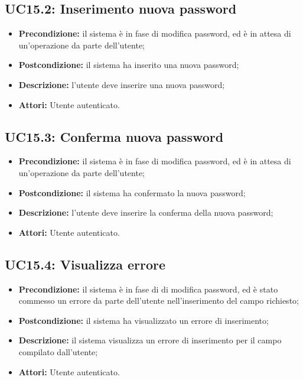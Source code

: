 \subsection{ UC15.2: Inserimento nuova password}

\begin{itemize}
	\item \textbf{Precondizione:} il sistema è in fase di modifica password, ed è in attesa di un'operazione da parte dell'utente;
	\item \textbf{Postcondizione:} il sistema ha inserito una nuova password;
	\item \textbf{Descrizione:} l'utente deve inserire una nuova password;
	\item \textbf{Attori:} Utente autenticato.
\end{itemize}
\subsection{ UC15.3: Conferma nuova password}

\begin{itemize}
	\item \textbf{Precondizione:} il sistema è in fase di modifica password, ed è in attesa di un'operazione da parte dell'utente;
	\item \textbf{Postcondizione:} il sistema ha confermato la nuova password;
	\item \textbf{Descrizione:} l'utente deve inserire la conferma della nuova password;
	\item \textbf{Attori:} Utente autenticato.
\end{itemize}
\subsection{ UC15.4: Visualizza errore}

\begin{itemize}
	\item \textbf{Precondizione:} il sistema è in fase di di modifica password, ed è stato commesso un errore da parte dell'utente nell'inserimento del campo richiesto;
	\item \textbf{Postcondizione:} il sistema ha visualizzato un errore di inserimento;
	\item \textbf{Descrizione:} il sistema visualizza un errore di inserimento per il campo compilato dall'utente;
	\item \textbf{Attori:} Utente autenticato.
\end{itemize}